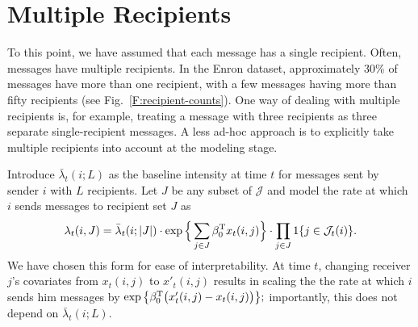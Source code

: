 \documentclass[aoas,preprint]{imsart}
\begin{document}
\section{Multiple Recipients}\label{S:multiple-recipients}

To this point, we have assumed that each message has a single recipient.
Often, messages have multiple recipients.  In the Enron dataset,
approximately 30\% of messages have more than one recipient, with
a few messages having more than fifty recipients
(see Fig.~\ref{F:recipient-counts}).  One way of dealing with multiple
recipients is, for example, treating a message with three recipients as three
separate single-recipient messages.  A less ad-hoc approach is to explicitly
take multiple recipients into account at the modeling stage.

Introduce $\bar \lambda_t(i ; L)$ as the baseline intensity at time $t$ for
messages sent by sender $i$ with $L$ recipients.  Let $J$ be any
subset of $\mathcal{J}$ and model the rate at which $i$ sends messages to
recipient set $J$ as
\begin{equation}\label{E:intensity-multiple}
    \lambda_t(i,J)
        =
        \bar \lambda_t(i ; |J|)
        \cdot
        \exp\Big\{
            \sum_{j \in J}
                \beta_0^\trans  x_t(i,j)
        \Big\}
        \cdot
        \prod_{j \in J}
        1\{ j \in \mathcal{J}_t(i) \}
        .
\end{equation}
We have chosen this form for ease of interpretability.  At time
$t$, changing receiver $j$'s covariates from $x_t(i,j)$ to
$x'_t(i,j)$ results in scaling the the rate at
which $i$ sends him messages by
\(
    \exp\big\{ \beta_0^{\mathrm{T}} \big(x'_t(i,j) - x_t(i,j)\big) \big\};
\)
importantly, this does not depend on $\bar \lambda_t(i; L)$.
\end{document}
